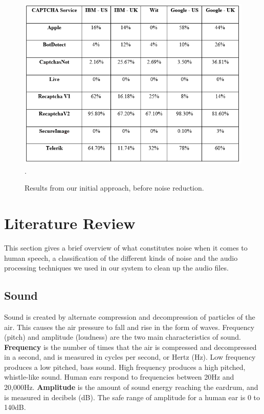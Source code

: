 \begin{figure}[t]
   \centering
   \includegraphics[width=\columnwidth]{figures/res1.png}.
   \caption{Results from our initial approach, before noise reduction.}
   \label{fig:results1}
\end{figure}


\section{Literature Review}
\label{sec:noisereduction}

This section gives a brief overview of what constitutes noise when it comes to human speech, a classification of the different kinds of noise and the audio processing techniques we used in our system to clean up the audio files.

\subsection{Sound}
Sound is created by alternate compression and decompression of particles of the air. This causes the air pressure to fall and rise in the form of waves. Frequency (pitch) and amplitude (loudness) are the two main characteristics of sound. \textbf{Frequency} is the number of times that the air is compressed and decompressed in a second, and is measured in cycles per second, or Hertz (Hz). Low frequency produces a low pitched, bass sound. High frequency produces a high pitched, whistle-like sound. Human ears respond to frequencies between 20Hz and 20,000Hz. \textbf{Amplitude} is the amount of sound energy reaching the eardrum, and is measured in decibels (dB). The safe range of amplitude for a human ear is 0 to 140dB.\newline

